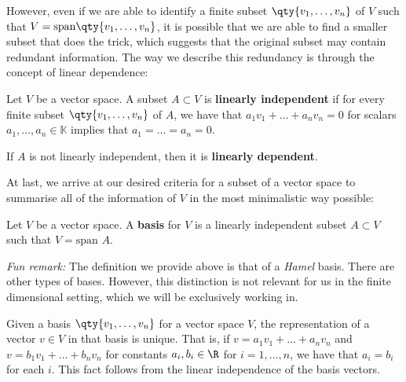 \vspace{3mm}

However, even if we are able to identify a finite subset \( \qty{v_1,\dots,v_n} \) of \( V \) such that \( V=\text{span}\qty{v_1,\dots,v_n} \), it is possible that we are able to find a smaller subset that does the trick, which suggests that the original subset may contain redundant information. The way we describe this redundancy is through the concept of linear dependence:

\begin{definition}
  Let \( V \) be a vector space. A subset \( A\subset V \) is \textbf{linearly independent} if for every finite subset \( \qty{v_1,\dots, v_n} \) of \( A \), we have that \(a_1v_1+\dots +a_nv_n=0  \) for scalars \( a_1,\dots, a_n\in\mathbb{K} \) implies that \( a_1=\dots =a_n=0 \).

  \vspace{3mm}

  If \( A \) is not linearly independent, then it is \textbf{linearly dependent}.
\end{definition}

At last, we arrive at our desired criteria for a subset of a vector space to summarise all of the information of \( V \) in the most minimalistic way possible:

\begin{definition}
  Let \( V \) be a vector space. A \textbf{basis} for \( V \) is a linearly independent subset \( A\subset V \) such that \( V=\text{span }A \).
\end{definition}

\emph{Fun remark:} The definition we provide above is that of a \emph{Hamel} basis. There are other types of bases. However, this distinction is not relevant for us in the finite dimensional setting, which we will be exclusively working in.

\vspace{3mm}

Given a basis \( \qty{v_1,\dots,v_n} \) for a vector space \( V \), the representation of a vector \( v\in V \) in that basis is unique. That is, if \( v=a_1v_1+\dots+a_nv_n \) and \( v=b_1v_1+\dots+b_nv_n \) for constants \( a_i,b_i\in\R \) for \( i=1,\dots, n \), we have that \( a_i=b_i \) for each \( i \). This fact follows from the linear independence of the basis vectors.

\vspace{3mm}

